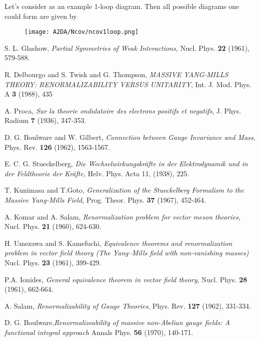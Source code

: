 \documentclass{article}
\begin{document}
Let's consider as an example 1-loop diagram. Then all possible diagrams one could form are given by 

\begin{figure}[h]
\texttt{[image: A2DA/Ncov/ncov1loop.png]}
\centering
\end{figure}



\newpage
\begin{thebibliography}{9}

S. L. Glashow, \textit{Partial Symmetries of Weak Interactions,} Nucl. Phys. \textbf{22} (1961), 579-588.

R. Delbourgo and S. Twisk and G. Thompson, \textit{MASSIVE YANG-MILLS THEORY: RENORMALIZABILITY VERSUS UNITARITY}, Int. J. Mod. Phys. A \textbf{3} (1988), 435

A. Proca, \textit{Sur la theorie ondulatoire des electrons positifs et negatifs}, J. Phys. Radium \textbf{7} (1936), 347-353.

 D. G. Boulware and W. Gilbert, \textit{Connection between Gauge Invariance and Mass,} Phys. Rev. \textbf{126} (1962), 1563-1567.

E. C. G. Stueckelberg, \textit{Die Wechselwirkungskräfte in der Elektrodynamik und in der Feldtheorie der Kräfte,} Helv. Phys. Acta 11, (1938), 225.

T. Kunimasa and T.Goto, \textit{Generalization of the Stueckelberg Formalism to the Massive Yang-Mills Field,} Prog. Theor. Phys. \textbf{37} (1967), 452-464.

A. Komar and A. Salam, \textit{Renormalization problem for vector meson theories,} Nucl. Phys. \textbf{21} (1960), 624-630.

H. Umezawa and S. Kamefuchi,  \textit{Equivalence theorems and renormalization problem in vector field theory
(The Yang–Mills field with non-vanishing masses)} Nucl. Phys. \textbf{23} (1961), 399-429.

P.A. Ionides, \textit{General equivalence theorem in vector field theory}, Nucl. Phys. \textbf{28} (1961), 662-664.

A. Salam, \textit{Renormalizability of Gauge Theories}, Phys. Rev. \textbf{127} (1962), 331-334.

 D. G. Boulware,\textit{Renormalizeability of massive non-Abelian gauge fields: A functional integral approach} Annals Phys. \textbf{56} (1970), 140-171.
 

\end{thebibliography}
\end{document}
